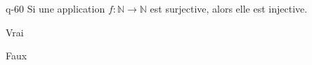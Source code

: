 \begin{truefalse}{q-60}
Si une application $f:\mathbb{N}\to \mathbb{N}$ est surjective, alors elle est injective.
\item Vrai
\item* Faux
\end{truefalse}

